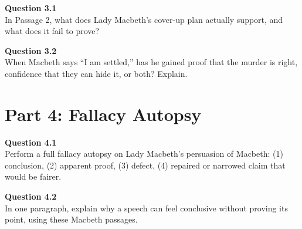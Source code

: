 \documentclass[12pt]{article}
\begin{document}
\textbf{Question 3.1}\\[-0.15em]
In Passage 2, what does Lady Macbeth's cover-up plan actually support, and what does it fail to prove?


\textbf{Question 3.2}\\[-0.15em]
When Macbeth says ``I am settled,'' has he gained proof that the murder is right, confidence that they can hide it, or both? Explain.


\newpage

\section*{Part 4: Fallacy Autopsy}

\textbf{Question 4.1}\\[-0.15em]
Perform a full fallacy autopsy on Lady Macbeth's persuasion of Macbeth: (1) conclusion, (2) apparent proof, (3) defect, (4) repaired or narrowed claim that would be fairer.


\textbf{Question 4.2}\\[-0.15em]
In one paragraph, explain why a speech can feel conclusive without proving its point, using these Macbeth passages.

\end{document}
